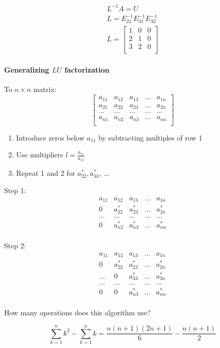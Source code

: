 \[
  \begin{matrix}
    L^{-1}A = U \\
    L = E_{21}^{-1} E_{31}^{-1} E_{32}^{-1} \\
    L = \begin{bmatrix}
      1 & 0 & 0 \\
      2 & 1 & 0 \\
      3 & 2 & 0 \\
    \end{bmatrix}
  \end{matrix}
\]

\paragraph{Generalizing $LU$ factorization} To $n \times n$ matrix:
\[
  \begin{bmatrix}
    a_{11} & a_{12} & a_{13} & ... &  a_{1n} \\
    a_{21} & a_{22} & a_{23} & ... &  a_{2n} \\
    ... & ... & ... & ... & ...  \\
    a_{n1} & a_{n2} & a_{n3} & ... &  a_{nn} \\
  \end{bmatrix}
\]

\begin{enumerate}
  \item Introduce zeros below $a_{11}$ by subtracting multiples of row 1
  \item Use multipliers $l = \frac{a_{i1}}{a_{11}}$
  \item Repeat 1 and 2 for $a_{22}^*,a_{33}^*$, ...
\end{enumerate}

Step 1:
\[
  \begin{array}{c|cccc}
    a_{11} & a_{12} & a_{13} & ... &  a_{1n} \\\hline
    0 & a_{22}^* & a_{23}^* & ... &  a_{2n}^* \\
    ... & ... & ... & ... & ...  \\
    0 & a_{n2}^* & a_{n3}^* & ... &  a_{nn}^* \\
  \end{array}
\]

Step 2:
\[
  \begin{array}{c|c|ccc}
    a_{11} & a_{12} & a_{13} & ... &  a_{1n} \\\hline
    0 & a_{22}^* & a_{23}^* & ... &  a_{2n}^* \\\hline
    ... & 0 & a_{33}^* & ... & a_{3n}^* \\
    ... & ... & ... & ... & ...  \\
    0 & 0 & a_{n3}^* & ... &  a_{nn}^* \\
  \end{array}
\]

How many operations does this algorithm use?

\[
  \sum_{k=1}^n k^2 - \sum_{k=1}^n k = \frac{n(n+1)(2n+1)}{6} - \frac{n(n+1)}{2}
\]